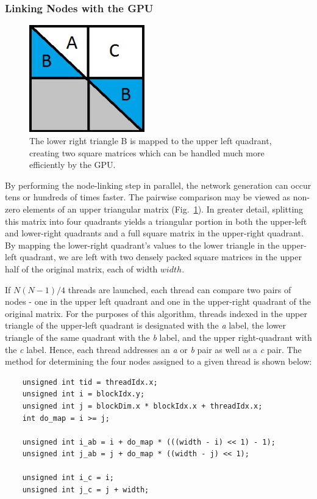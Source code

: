 \documentclass[preprint,notitlepage,amsmath,amssymb,floatfix]{revtex4-1}
\begin{document}
\subsubsection{Linking Nodes with the GPU}

\begin{figure}
\includegraphics[width=5cm]{figures/Matrix_Map.jpg}
\caption{The lower right triangle B is mapped to the upper left quadrant, creating two square matrices which can be handled much more efficiently by the GPU.}
\label{fig:matrix_map}
\centering
\end{figure}

By performing the node-linking step in parallel, the network generation can occur tens or hundreds of times faster.
The pairwise comparison may be viewed as non-zero elements of an upper triangular matrix (Fig.~\ref{fig:matrix_map}).
In greater detail, splitting this matrix into four quadrants yields a triangular portion in both the upper-left and lower-right quadrants and a full square matrix in the upper-right quadrant.
By mapping the lower-right quadrant's values to the lower triangle in the upper-left quadrant, we are left with two densely packed square matrices in the upper half of the original matrix, each of width $width$. \par
If $N(N-1)/4$ threads are launched, each thread can compare two pairs of nodes - one in the upper left quadrant and one in the upper-right quadrant of the original matrix.
For the purposes of this algorithm, threads indexed in the upper triangle of the upper-left quadrant is designated with the \textit{a} label, the lower triangle of the same quadrant with the \textit{b} label, and the upper right-quadrant with the \textit{c} label.  
Hence, each thread addresses an \textit{a} or \textit{b} pair as well as a \textit{c} pair.  
The method for determining the four nodes assigned to a given thread is shown below:

\begin{lstlisting}
	unsigned int tid = threadIdx.x;
	unsigned int i = blockIdx.y;
	unsigned int j = blockDim.x * blockIdx.x + threadIdx.x;
	int do_map = i >= j;

	unsigned int i_ab = i + do_map * (((width - i) << 1) - 1);
	unsigned int j_ab = j + do_map * ((width - j) << 1);

	unsigned int i_c = i;
	unsigned int j_c = j + width;
\end{lstlisting}
\end{document}
